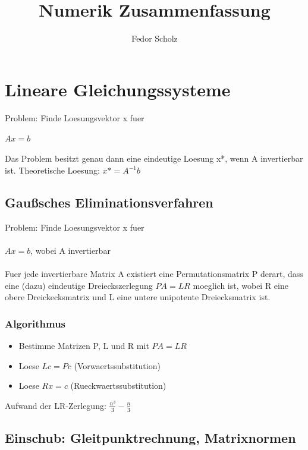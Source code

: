 \documentclass[a4paper]{scrreprt}
\begin{document}
\title{Numerik Zusammenfassung}
\author{Fedor Scholz}
\maketitle

\tableofcontents
\vspace{1cm}

\chapter{Lineare Gleichungssysteme}

Problem: Finde Loesungsvektor x fuer\\\\
$Ax = b$\\\\
Das Problem besitzt genau dann eine eindeutige Loesung x*, wenn A invertierbar ist.
Theoretische Loesung: $x* = A^{-1}b$

\section{Gaußsches Eliminationsverfahren}

Problem: Finde Loesungsvektor x fuer\\\\
$Ax = b$, wobei A invertierbar\\\\
Fuer jede invertierbare Matrix A existiert eine Permutationsmatrix P derart, dass eine (dazu) eindeutige Dreieckszerlegung $PA = LR$ moeglich ist, wobei R eine obere Dreickecksmatrix und L eine untere unipotente Dreiecksmatrix ist.

\subsection{Algorithmus}

\begin{itemize}
	\item Bestimme Matrizen P, L und R mit $PA = LR$
	\item Loese $Lc = Pc$ (Vorwaertssubstitution)
	\item Loese $Rx = c$ (Rueckwaertssubstitution)
\end{itemize}

Aufwand der LR-Zerlegung: $\frac{n^3}{3} - \frac{n}{3}$

\section{Einschub: Gleitpunktrechnung, Matrixnormen}
\end{document}
